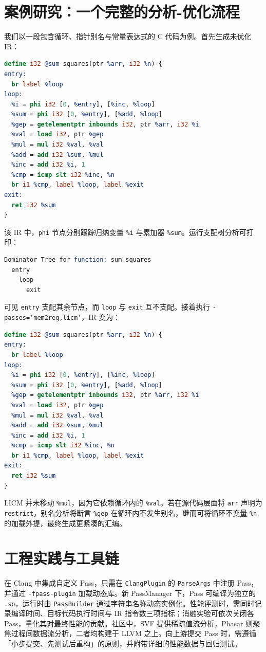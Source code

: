 \chapter{案例研究：一个完整的分析-优化流程}
我们以一段包含循环、指针别名与常量表达式的 C 代码为例。首先生成未优化 IR：\par
\begin{lstlisting}[language=llvm]
define i32 @sum squares(ptr %arr, i32 %n) {
entry:
  br label %loop
loop:
  %i = phi i32 [0, %entry], [%inc, %loop]
  %sum = phi i32 [0, %entry], [%add, %loop]
  %gep = getelementptr inbounds i32, ptr %arr, i32 %i
  %val = load i32, ptr %gep
  %mul = mul i32 %val, %val
  %add = add i32 %sum, %mul
  %inc = add i32 %i, 1
  %cmp = icmp slt i32 %inc, %n
  br i1 %cmp, label %loop, label %exit
exit:
  ret i32 %sum
}
\end{lstlisting}
该 IR 中，\texttt{phi} 节点分别跟踪归纳变量 \texttt{\%{}i} 与累加器 \texttt{\%{}sum}。运行支配树分析可打印：\par
\begin{lstlisting}[language=llvm]
 Dominator Tree for function: sum squares
  entry
    loop
      exit
\end{lstlisting}
可见 \texttt{entry} 支配其余节点，而 \texttt{loop} 与 \texttt{exit} 互不支配。接着执行 \texttt{-passes='mem2reg,licm'}，IR 变为：\par
\begin{lstlisting}[language=llvm]
define i32 @sum squares(ptr %arr, i32 %n) {
entry:
  br label %loop
loop:
  %i = phi i32 [0, %entry], [%inc, %loop]
  %sum = phi i32 [0, %entry], [%add, %loop]
  %gep = getelementptr inbounds i32, ptr %arr, i32 %i
  %val = load i32, ptr %gep
  %mul = mul i32 %val, %val
  %add = add i32 %sum, %mul
  %inc = add i32 %i, 1
  %cmp = icmp slt i32 %inc, %n
  br i1 %cmp, label %loop, label %exit
exit:
  ret i32 %sum
}
\end{lstlisting}
LICM 并未移动 \texttt{\%{}mul}，因为它依赖循环内的 \texttt{\%{}val}。若在源代码层面将 \texttt{arr} 声明为 \texttt{restrict}，别名分析将断言 \texttt{\%{}gep} 在循环内不发生别名，继而可将循环不变量 \texttt{\%{}n} 的加载外提，最终生成更紧凑的汇编。\par
\chapter{工程实践与工具链}
在 Clang 中集成自定义 Pass，只需在 \texttt{ClangPlugin} 的 \texttt{ParseArgs} 中注册 Pass，并通过 \texttt{-fpass-plugin} 加载动态库。新 PassManager 下，Pass 可编译为独立的 \texttt{.so}，运行时由 \texttt{PassBuilder} 通过字符串名称动态实例化。性能评测时，需同时记录编译时间、目标代码执行时间与 IR 指令数三项指标；消融实验可依次关闭各 Pass，量化其对最终性能的贡献。社区中，SVF 提供稀疏值流分析，Phasar 则聚焦过程间数据流分析，二者均构建于 LLVM 之上。向上游提交 Pass 时，需遵循「小步提交、先测试后重构」的原则，并附带详细的性能数据与回归测试。\par
